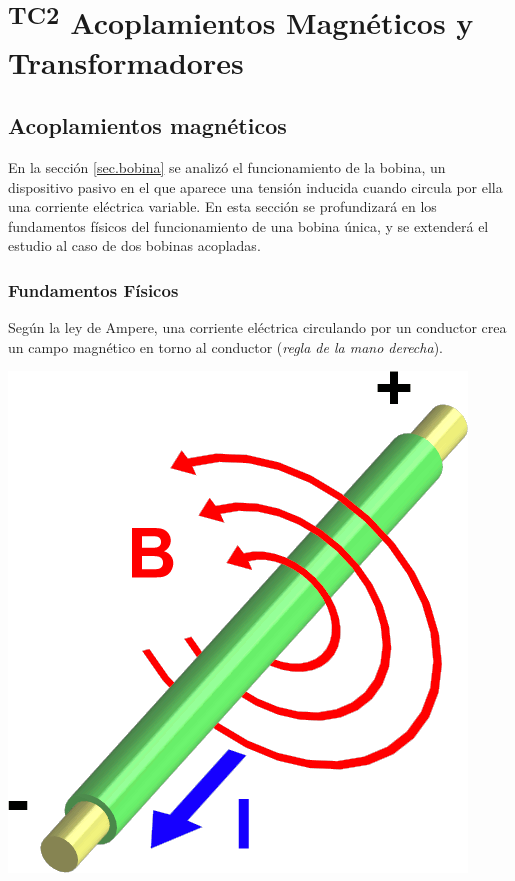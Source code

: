 \chapter{\textsuperscript{TC2} Acoplamientos Magnéticos y Transformadores}\label{chap.transformadores}

\section{Acoplamientos magnéticos}
\label{sec:acoplamientos}

En la sección \ref{sec.bobina} se analizó el funcionamiento de la bobina, un dispositivo pasivo en el que aparece una tensión inducida cuando circula por ella una corriente eléctrica variable. En esta sección se profundizará en los fundamentos físicos del funcionamiento de una bobina única, y se extenderá el estudio al caso de dos bobinas acopladas.

\subsection{Fundamentos Físicos}
\label{sec:fisica-bobina}

Según la ley de Ampere, una corriente eléctrica circulando por un conductor crea un campo magnético en torno al conductor (\emph{regla de la mano derecha}).

\begin{center}
\includegraphics[height=0.2\textheight]{../figs/Electromagnetism.png}
\end{center}

